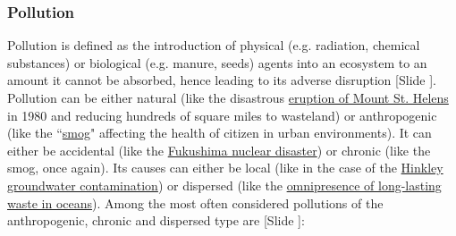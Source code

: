 \documentclass{article}
\newcounter{slide}
\begin{document}
\subsubsection{Pollution}
\label{sec:pollution}
Pollution is defined as the introduction of physical (e.g. radiation, chemical substances) or biological (e.g. manure, seeds) agents into an ecosystem to an amount it cannot be absorbed, hence leading to its adverse disruption {\color{blue}[Slide ]}. Pollution can be either natural (like the disastrous \href{https://en.wikipedia.org/wiki/1980_eruption_of_Mount_St._Helens}{eruption of Mount St. Helens} in 1980 and reducing hundreds of square miles to wasteland) or anthropogenic (like the ``\href{https://en.wikipedia.org/wiki/Smog}{smog}" affecting the health of citizen in urban environments). It can either be accidental (like the \href{https://en.wikipedia.org/wiki/Fukushima_Daiichi_nuclear_disaster}{Fukushima nuclear disaster}) or chronic (like the smog, once again). Its causes can either be local (like in the case of the \href{https://en.wikipedia.org/wiki/Hinkley_groundwater_contamination}{Hinkley groundwater contamination}) or dispersed (like the \href{https://en.wikipedia.org/wiki/Marine_debris}{omnipresence of long-lasting waste in oceans}). Among the most often considered pollutions of the anthropogenic, chronic and dispersed type are {\color{blue}[Slide ]}:
\end{document}
